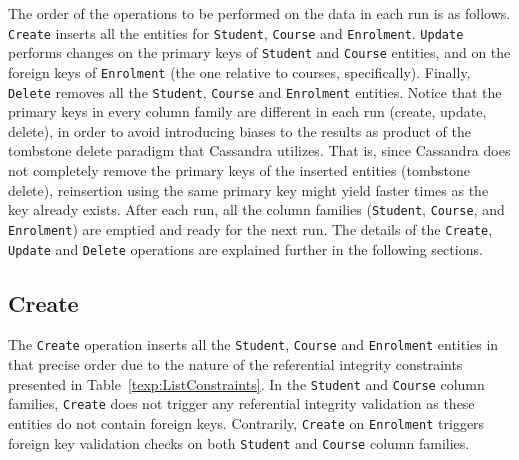 		
The order of the operations to be performed on the data in each run is as
follows.
\texttt{Create} inserts all the entities for \texttt{Student},  \texttt{Course}
and \texttt{Enrolment}.  \texttt{Update} performs changes on the primary keys of
\texttt{Student} and \texttt{Course} entities,  and on the foreign keys of
\texttt{Enrolment} (the one relative to courses,  specifically).  Finally, 
\texttt{Delete} removes all the \texttt{Student},  \texttt{Course} and
\texttt{Enrolment} entities.
Notice that the primary keys in every column family are different in each run
(create,  update,  delete), in order to avoid introducing biases to the results
as product of the tombstone delete paradigm that Cassandra utilizes.  That is, 
since Cassandra does not completely  remove the primary keys of the inserted
entities (tombstone delete),  reinsertion  using the same primary key might
yield faster times as the key already exists.  After each run,  all the column families
(\texttt{Student},  \texttt{Course},  and \texttt{Enrolment}) are emptied and
ready for the next run.   The details  of the \texttt{Create}, \texttt{Update}
and \texttt{Delete} operations are explained further in the following sections. 
		

	
\subsection{Create}
The \texttt{Create} operation inserts all the
\texttt{Student},  \texttt{Course} and \texttt{Enrolment} entities in that
precise order due to the nature of the referential integrity constraints
presented in Table~\ref{texp:ListConstraints}.   In the \texttt{Student} and
 \texttt{Course} column families,  \texttt{Create} does not trigger any
 referential integrity validation as these entities do not contain foreign keys. 
 Contrarily,  \texttt{Create} on \texttt{Enrolment} triggers foreign key
 validation checks on both \texttt{Student} and \texttt{Course} column families. 
		
